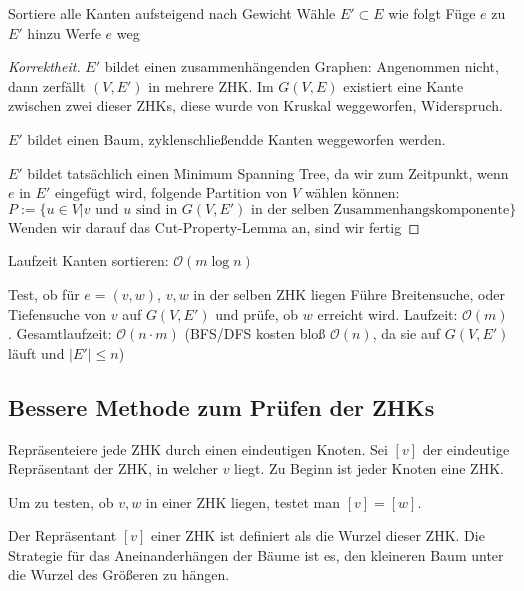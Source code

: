 \documentclass[11pt]{scrbook}
\renewcommand{\O}{\mathcal{O}}
\begin{document}
\begin{alg}
	\begin{algorithmic}
		\State Sortiere alle Kanten aufsteigend nach Gewicht
		\State Wähle $E' \subset E$ wie folgt
				\State Füge $e$ zu $E'$ hinzu
			\Else
				\State Werfe $e$ weg
			\EndIf
		\EndFor
	\end{algorithmic}

	\begin{proof}[Korrektheit]
		$E'$ bildet einen zusammenhängenden Graphen:
		Angenommen nicht, dann zerfällt $(V,E')$ in mehrere ZHK.
		Im $G(V,E)$ existiert eine Kante zwischen zwei dieser ZHKs, diese wurde von Kruskal weggeworfen, Widerspruch.

		$E'$ bildet einen Baum, zyklenschließendde Kanten weggeworfen werden.

		$E'$ bildet tatsächlich einen Minimum Spanning Tree, da wir zum Zeitpunkt, wenn $e$ in $E'$ eingefügt wird, folgende Partition von $V$ wählen können:
		\[
			P := \{u \in V \Big| \text{$v$ und $u$ sind in $G(V,E')$ in der selben Zusammenhangskomponente}\}
		\]
		Wenden wir darauf das Cut-Property-Lemma an, sind wir fertig
	\end{proof}

	\begin{seg}{Laufzeit}
		Kanten sortieren: $\O(m\log n)$		
	\end{seg}
	\begin{seg}{Test, ob für $e=(v,w)$, $v,w$ in der selben ZHK liegen}
		Führe Breitensuche, oder Tiefensuche von $v$ auf $G(V,E')$ und prüfe, ob $w$ erreicht wird.
		Laufzeit: $\O(m)$.
		Gesamtlaufzeit: $\O(n\cdot m)$ (BFS/DFS kosten bloß $\O(n)$, da sie auf $G(V,E')$ läuft und $|E'|\le n$)
	\end{seg}
\end{alg}

\subsection{Bessere Methode zum Prüfen der ZHKs}
Repräsenteiere jede ZHK durch einen eindeutigen Knoten.
Sei $[v]$ der eindeutige Repräsentant der ZHK, in welcher $v$ liegt.
Zu Beginn ist jeder Knoten eine ZHK.

Um zu testen, ob $v,w$ in einer ZHK liegen, testet man $[v]=[w]$.

Der Repräsentant $[v]$ einer ZHK ist definiert als die Wurzel dieser ZHK.
Die Strategie für das Aneinanderhängen der Bäume ist es, den kleineren Baum unter die Wurzel des Größeren zu hängen.	
\end{document}
